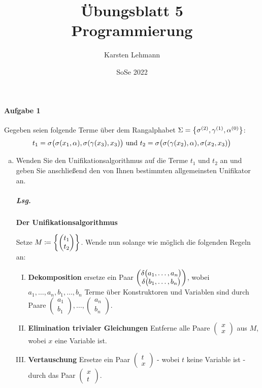 \documentclass{scrreprt}
\author{Karsten Lehmann}
\date{SoSe 2022}
\title{Übungsblatt 5\\Programmierung}
\begin{document}
\paragraph{Aufgabe 1} Gegeben seien folgende Terme über dem Rangalphabet
$\Sigma = \qty\big{\sigma^{(2)}, \gamma^{(1)}, \alpha^{(0)}}$:
\[
  t_1 = \sigma\qty\big(\sigma(x_1, \alpha), \sigma(\gamma(x_3), x_3))
  \text{ und }
  t_2 = \sigma\qty\big(\sigma(\gamma(x_2), \alpha), \sigma(x_2, x_3))
\]
\begin{enumerate}[(a)]
\item Wenden Sie den Unifikationsalgorithmus auf die Terme $t_1$ und $t_2$ an
  und geben Sie anschließend den von Ihnen bestimmten allgemeinsten Unifikator
  an.

  \subparagraph{Lsg.} \textbf{Der Unifikationsalgorithmus}

  Setze $M \coloneqq \qty{\begin{pmatrix}t_1 \\ t_2\end{pmatrix}}$.
  Wende nun solange wie möglich die folgenden Regeln an:
  \begin{enumerate}[(I)]
  \label{uni:1}
  \item \textbf{Dekomposition} ersetze ein Paar $\begin{pmatrix}
      \delta \qty\big(a_1, \ldots, a_n) \\
      \delta \qty\big(b_1, \ldots, b_n)
    \end{pmatrix}$, wobei $a_1, \ldots, a_n, b_1, \ldots, b_n$ Terme über
    Konstruktoren und Variablen sind durch Paare
    $\begin{pmatrix}a_1\\b_1\end{pmatrix},
    \ldots,
    \begin{pmatrix}a_n\\b_n\end{pmatrix}$.

  \label{uni:2}
  \item \textbf{Elimination trivialer Gleichungen} Entferne alle Paare
    $\begin{pmatrix}x\\x\end{pmatrix}$ aus $M$, wobei $x$ eine Variable ist.

  \label{uni:3}
  \item \textbf{Vertauschung} Ersetze ein Paar $\begin{pmatrix}t\\x\end{pmatrix}$
    - wobei $t$ keine Variable ist - durch das Paar
    $\begin{pmatrix}x\\t\end{pmatrix}$.


\end{enumerate}
\end{enumerate}
\end{document}
